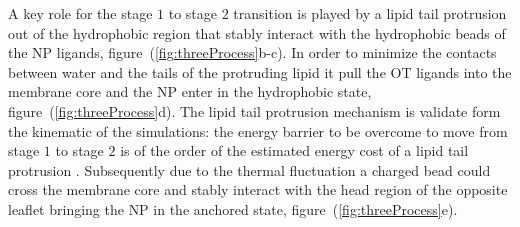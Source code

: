 A key role for the stage $1$ to stage $2$ transition is played by a lipid tail protrusion out of the hydrophobic 
region that stably interact with the hydrophobic beads of the \ac{NP} ligands, 
figure~(\ref{fig:threeProcess}b-c). In order to minimize the contacts between water and the tails of the 
protruding lipid it pull the \ac{OT} ligands into the membrane core and the \ac{NP} enter in the hydrophobic 
state, figure~(\ref{fig:threeProcess}d). The lipid tail protrusion mechanism is validate form the 
kinematic of the simulations: the energy barrier to be overcome to move from stage $1$ to stage $2$ is of the 
order of the estimated energy cost of a lipid tail protrusion \cite{VanLehn2015}. Subsequently due to the thermal 
fluctuation a charged bead could cross the membrane core and stably interact with the head region of the opposite 
leaflet bringing the \ac{NP} in the anchored state, figure~(\ref{fig:threeProcess}e).
